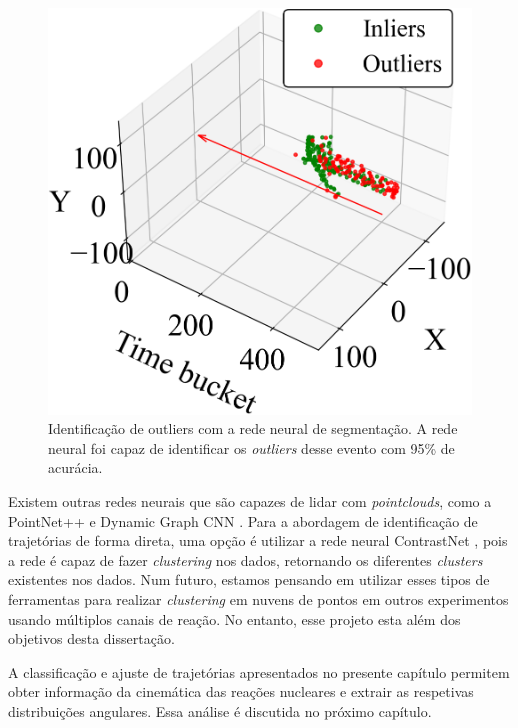 \documentclass[a4paper,12pt,oneside]{book}
\begin{document}
\begin{figure}[H]
    \centering
    \includegraphics[scale = 0.4]{figs/pointnet_seg_ex1.png}
    \caption{Identificação de outliers com a rede neural de segmentação. A rede neural foi capaz de identificar os \textit{outliers} desse evento com 95\% de acurácia.}
    \label{fig:pointnet_segment_exs}
\end{figure}

\par Existem outras redes neurais que são capazes de lidar com \textit{pointclouds}, como a PointNet++ \cite{qi2017pointnetplusplus} e Dynamic Graph CNN \cite{graph_cnn}. Para a abordagem de identificação de trajetórias de forma direta, uma opção é utilizar a rede neural ContrastNet \cite{contrastnet}, pois a rede é capaz de fazer \textit{clustering} nos dados, retornando os diferentes \textit{clusters} existentes nos dados. Num futuro, estamos pensando em utilizar esses tipos de ferramentas para realizar \textit{clustering} em nuvens de pontos em outros experimentos usando múltiplos canais de reação. No entanto, esse projeto esta além dos objetivos desta dissertação.

\par A classificação e ajuste de trajetórias apresentados no presente capítulo permitem obter informação da cinemática das reações nucleares e extrair as respetivas distribuições angulares. Essa análise é discutida no próximo capítulo.
\end{document}
